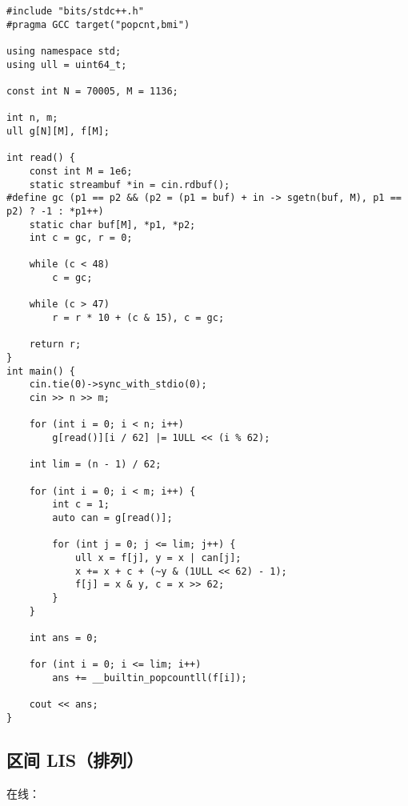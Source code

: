 \documentclass[12pt]{ctexart}
\begin{document}
\begin{lstlisting}
#include "bits/stdc++.h"
#pragma GCC target("popcnt,bmi")

using namespace std;
using ull = uint64_t;

const int N = 70005, M = 1136;

int n, m;
ull g[N][M], f[M];

int read() {
    const int M = 1e6;
    static streambuf *in = cin.rdbuf();
#define gc (p1 == p2 && (p2 = (p1 = buf) + in -> sgetn(buf, M), p1 == p2) ? -1 : *p1++)
    static char buf[M], *p1, *p2;
    int c = gc, r = 0;

    while (c < 48)
        c = gc;

    while (c > 47)
        r = r * 10 + (c & 15), c = gc;

    return r;
}
int main() {
    cin.tie(0)->sync_with_stdio(0);
    cin >> n >> m;

    for (int i = 0; i < n; i++)
        g[read()][i / 62] |= 1ULL << (i % 62);

    int lim = (n - 1) / 62;

    for (int i = 0; i < m; i++) {
        int c = 1;
        auto can = g[read()];

        for (int j = 0; j <= lim; j++) {
            ull x = f[j], y = x | can[j];
            x += x + c + (~y & (1ULL << 62) - 1);
            f[j] = x & y, c = x >> 62;
        }
    }

    int ans = 0;

    for (int i = 0; i <= lim; i++)
        ans += __builtin_popcountll(f[i]);

    cout << ans;
}
\end{lstlisting}

\subsection{区间 LIS（排列）}

在线：
\end{document}
